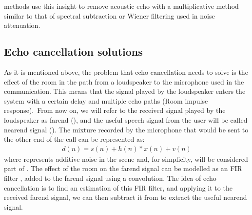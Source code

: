 \documentclass[letterpaper,10pt,english]{jupyterBook}
\begin{document}
\sphinxAtStartPar
{} methods use this insight to remove acoustic echo with
a multiplicative method similar to that of spectral subtraction or
Wiener filtering used in noise attenuation.


\subsection{Echo cancellation solutions}
\label{\detokenize{Enhancement/Echo_cancellation:echo-cancellation-solutions}}
\sphinxAtStartPar
As it is mentioned above, the problem that echo cancellation needs to
solve is the effect of the room in the path from a loudspeaker to the
microphone used in the communication. This means that the signal played
by the loudspeaker enters the system with a certain delay and multiple
echo paths (Room impulse response). From now on, we will refer to the
received signal played by the loudspeaker as far\sphinxhyphen{}end (), and the
useful speech signal from the user will be called near\sphinxhyphen{}end signal
(). The mixture recorded by the microphone that would be sent to
the other end of the call can be represented as:
\begin{equation*}
\begin{split} d(n) = s(n) + h(n)*x(n) + v(n) \end{split}
\end{equation*}
\sphinxAtStartPar
where  represents additive noise in the scene and, for simplicity,
will be considered part of . The effect of the room on the far\sphinxhyphen{}end
signal can be modelled as an FIR filter , added to the far\sphinxhyphen{}end
signal using a convolution. The idea of echo cancellation is to find an
estimation of this FIR filter, and applying it to the received far\sphinxhyphen{}end
signal, we can then subtract it from  to extract the useful
near\sphinxhyphen{}end signal.
\end{document}
